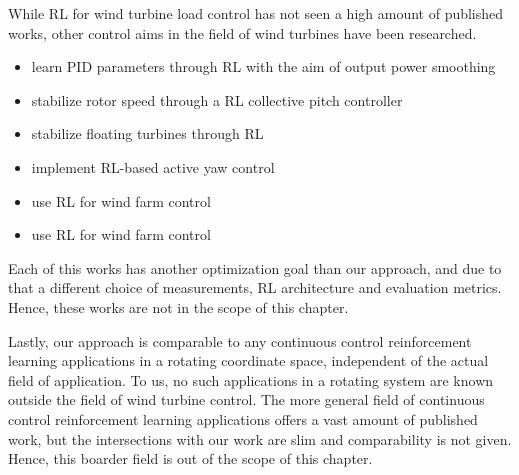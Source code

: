While RL for wind turbine load control has not seen a high amount of published works, other control aims in the field of wind turbines have been researched.
\begin{itemize}
  \item \citet{hosseiniImprovingResponseWind2020} learn PID parameters through \ac{RL} with the aim of output power smoothing
  \item \citet{chenReinforcementbasedRobustVariable2020} stabilize rotor speed through a \ac{RL} collective pitch controller
  \item \citet{zhangReinforcementLearningBasedStructural2020} stabilize floating turbines through \ac{RL}
  \item \citet{saenz-aguirreArtificialNeuralNetwork2019} implement \ac{RL}-based active yaw control
  \item \citet{zhaoCooperativeWindFarm2020} use \ac{RL} for wind farm control
  \item \citet{padullaparthiFALCONFArmLevel2022} use \ac{RL} for wind farm control
\end{itemize}
Each of this works has another optimization goal than our approach, and due to that a different choice of measurements, RL architecture and evaluation metrics. Hence, these works are not in the scope of this chapter.

Lastly, our approach is comparable to any continuous control reinforcement learning applications in a rotating coordinate space, independent of the actual field of application. To us, no such applications in a rotating system are known outside the field of wind turbine control. The more general field of continuous control reinforcement learning applications offers a vast amount of published work, but the intersections with our work are slim and comparability is not given. Hence, this boarder field is out of the scope of this chapter.










